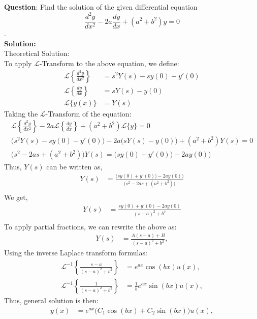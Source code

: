 \documentclass[journal]{IEEEtran}
\begin{document}
	
	\textbf{Question}:\newline
	Find the solution of the given differential equation$$\frac{d^2y}{dx^2} - 2a \frac{dy}{dx} + (a^2 + b^2)y = 0 $$. \\
	\textbf{Solution: }\\
	Theoretical Solution: \\
	To apply $\mathcal{L}$-Transform to the above equation, we define:
	\begin{align}
		\mathcal{L}\left\{\frac{d^2y}{dx^2}\right\} &= s^2 Y(s) - s y(0) - y'(0) \\
		\mathcal{L}\left\{\frac{dy}{dx}\right\} &= s Y(s) - y(0) \\
		\mathcal{L}\{y(x)\} &= Y(s)
	\end{align}
	Taking the $\mathcal{L}$-Transform of the equation:
	\begin{align}
		\mathcal{L}\left\{\frac{d^2y}{dx^2}\right\} - 2a \mathcal{L}\left\{\frac{dy}{dx}\right\} + (a^2 + b^2) \mathcal{L}\{y\} = 0 \\
		\big(s^2 Y(s) - s y(0) - y'(0)\big) - 2a \big(s Y(s) - y(0)\big) + (a^2 + b^2) Y(s) = 0 \\
		\big(s^2 - 2as + (a^2 + b^2)\big) Y(s) = \big(s y(0) + y'(0)\big) - 2a y(0))
	\end{align}
	Thus, $Y(s)$ can be written as, 
	\begin{align}
	 	Y(s) &= \frac{\big(s y(0) + y'(0)\big) - 2a y(0))}{	\big(s^2 - 2as + (a^2 + b^2)\big)}\\
	\end{align}
	We get, 
	\begin{align}
		Y(s) &= \frac{s y(0) + y'(0) - 2a y(0)}{(s - a)^2 + b^2}\\
	\end{align}
	To apply partial fractions, we can rewrite the above as:
	\begin{align}
				Y(s) &= \frac{A(s - a) + B}{(s - a)^2 + b^2},
	\end{align}
	Using the inverse Laplace transform formulas:
	\begin{align}
		\mathcal{L}^{-1}\left\{\frac{s - a}{(s - a)^2 + b^2}\right\} &= e^{ax} \cos(bx)u(x), \\
		\mathcal{L}^{-1}\left\{\frac{1}{(s - a)^2 + b^2}\right\} &= \frac{1}{b} e^{ax} \sin(bx)u(x),
	\end{align}
	Thus, general solution is then:
	\begin{align}
		y(x) &= e^{ax} \big(C_1 \cos(bx) + C_2 \sin(bx)\big)u(x),
	\end{align}
\end{document}
